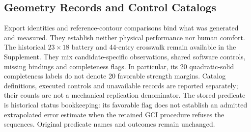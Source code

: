 \subsection{Geometry Records and Control Catalogs}
\label{subsec:family-geometry}
\label{subsec:family-reference}
\label{subsec:family-controls}
Export identities and reference-contour comparisons bind what was generated and measured. They establish neither physical performance nor human comfort. The historical $23\times18$ battery and 44-entry crosswalk remain available in the Supplement. They mix candidate-specific observations, shared software controls, missing bindings and completeness flags. In particular, its 20 quadratic-solid completeness labels do not denote 20 favorable strength margins. Catalog definitions, executed controls and unavailable records are reported separately; their counts are not a mechanical replication denominator. The stored  predicate is historical status bookkeeping: its favorable flag does not establish an admitted extrapolated error estimate when the retained GCI procedure refuses the sequences. Original predicate names and outcomes remain unchanged.
